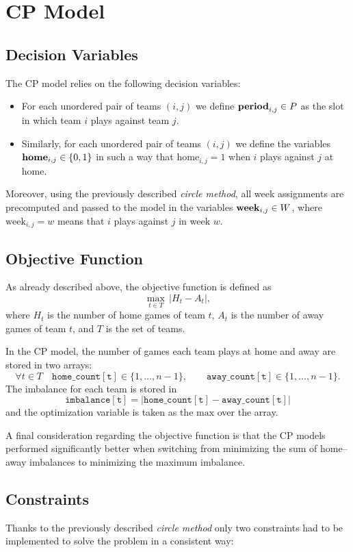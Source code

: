 \section{CP Model}

\subsection{Decision Variables}
The CP model relies on the following decision variables:

\begin{itemize}
    \item For each unordered pair of teams $(i,j)$ we define $\text{\textbf{period}}_{i,j} \in P$ as the slot in which team $i$ plays against team $j.$
    \item Similarly, for each unordered pair of teams $(i,j)$ we define the variables $\text{\textbf{home}}_{i,j}\in \{0, 1\}$ in such a way that $\text{home}_{i,j}=1$ when $i$ plays against $j$ at home.
\end{itemize}

Moreover, using the previously described \emph{circle method}, all week assignments are precomputed and passed to the model in the variables $\text{\textbf{week}}_{i,j} \in W$, where $\text{week}_{i,j} = w$ means that $i$ plays against $j$ in week $w$.

\subsection{Objective Function}
As already described above, the objective function is defined as
\[
\max_{t \in T} \, |H_t - A_t|,
\]
where \(H_t\) is the number of home games of team \(t\), \(A_t\) is the number of away games of team \(t\), and \(T\) is the set of teams.

In the CP model, the number of games each team plays at home and away are stored in two arrays:
\[
\forall t \in T \quad \mathtt{home\_count[t]} \in \{1, \dots, n-1\}, 
\qquad
\mathtt{away\_count[t]} \in \{1, \dots, n-1\}.
\]
The imbalance for each team is stored in
\[
\mathtt{imbalance[t]} = \lvert \mathtt{home\_count[t]} - \mathtt{away\_count[t]} \rvert
\]
and the optimization variable is taken as the $\text{max}$ over the array.

A final consideration regarding the objective function is that the CP models performed significantly better when switching from minimizing the sum of home–away imbalances to minimizing the maximum imbalance.

\subsection{Constraints}
Thanks to the previously described \emph{circle method} only two constraints had to be implemented to solve the problem in a consistent way:

